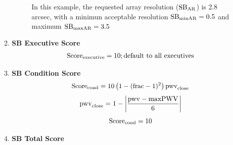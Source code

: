 \documentclass[a4paper,10pt,english]{sphinxmanual}
\begin{document}
\begin{enumerate}
\begin{figure}[htbp]
\caption{In this example, the requested array resolution (\(\rm{SB}_{\rm{AR}}\))
is 2.8 arcsec, with a minimun acceptable resolution
\(\rm{SB}_{\rm{minAR}} = 0.5\) and maximum
\(\rm{SB}_{\rm{maxAR}} = 3.5\)}\end{figure}

\item {} 
\textbf{SB Executive Score}
\label{algorithm:equation-exscore}\begin{gather}
\begin{split}\rm{Score}_{\rm{executive}} = 10; \rm{default\ to\ all\ executives}\end{split}\label{algorithm-exscore}
\end{gather}
\item {} 
\textbf{SB Condition Score}
\label{algorithm:equation-frac_und_1}\begin{gather}
\begin{split}\rm{Score}_{\rm{cond}} = 10 \left(1- (\rm{frac}-1)^{2}\right) \rm{pwv}_{\rm{close}}\end{split}\label{algorithm-frac_und_1}
\end{gather}\label{algorithm:equation-pwv_close}\begin{gather}
\begin{split}\rm{pwv}_{\rm{close}} = 1 - \left|\frac{\rm{pwv} - \rm{maxPWV}}{6}\right|\end{split}\label{algorithm-pwv_close}
\end{gather}\label{algorithm:equation-frac_1}\begin{gather}
\begin{split}\rm{Score}_{\rm{cond}} = 10\end{split}\label{algorithm-frac_1}
\end{gather}
\item {} 
\textbf{SB Total Score}

\end{enumerate}
\end{document}
